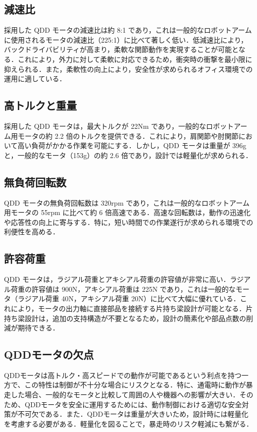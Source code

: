 \subsection{減速比}
採用した QDD モータの減速比は約 8:1 であり，これは一般的なロボットアームに使用されるモータの減速比（225:1）に比べて著しく低い．低減速比により，バックドライバビリティが高まり，柔軟な関節動作を実現することが可能となる．これにより，外力に対して柔軟に対応できるため，衝突時の衝撃を最小限に抑えられる．また，柔軟性の向上により，安全性が求められるオフィス環境での運用に適している．
\subsection{高トルクと重量}
採用した QDD モータは，最大トルクが 22Nm であり，一般的なロボットアーム用モータの約 2.2 倍のトルクを提供できる．これにより，肩関節や肘関節において高い負荷がかかる作業を可能にする．しかし，QDD モータは重量が 396g と，一般的なモータ（153g）の約 2.6 倍であり，設計では軽量化が求められる．
\subsection{無負荷回転数}
QDD モータの無負荷回転数は 320rpm であり，これは一般的なロボットアーム用モータの 55rpm に比べて約 6 倍高速である．高速な回転数は，動作の迅速化や応答性の向上に寄与する．特に，短い時間での作業遂行が求められる環境での利便性を高める．
\subsection{許容荷重}
QDD モータは，ラジアル荷重とアキシアル荷重の許容値が非常に高い．ラジアル荷重の許容値は 900N，アキシアル荷重は 225N であり，これは一般的なモータ（ラジアル荷重 40N，アキシアル荷重 20N）に比べて大幅に優れている．これにより，モータの出力軸に直接部品を接続する片持ち梁設計が可能となる．片持ち梁設計は，追加の支持構造が不要となるため，設計の簡素化や部品点数の削減が期待できる．
\subsection{QDDモータの欠点}
QDDモータは高トルク・高スピードでの動作が可能であるという利点を持つ一方で、この特性は制御が不十分な場合にリスクとなる．特に、通電時に動作が暴走した場合、一般的なモータと比較して周囲の人や機器への影響が大きい．そのため、QDDモータを安全に運用するためには、動作制御における適切な安全対策が不可欠である．また．QDDモータは重量が大きいため，設計時には軽量化を考慮する必要がある．軽量化を図ることで，暴走時のリスク軽減にも繋がる．
\newpage